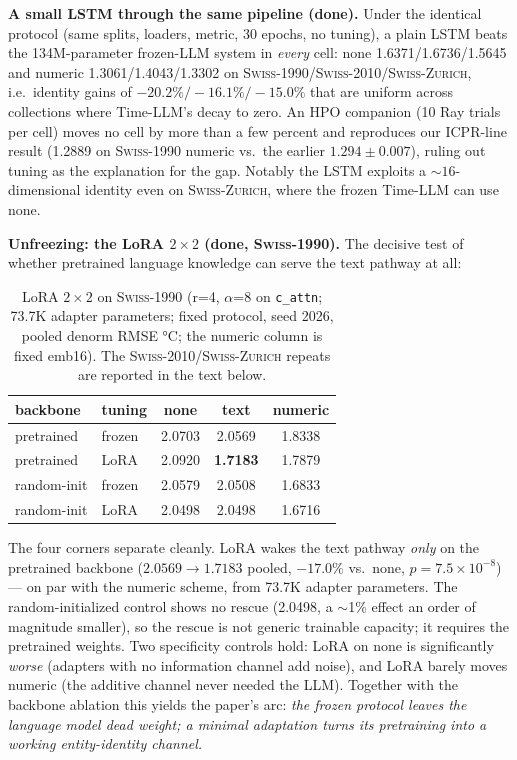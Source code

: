 \documentclass[sigconf,review]{acmart}
\newcommand{\inprogress}[1]{\textcolor{blue}{\textbf{[IN PROGRESS:} #1\textbf{]}}}
\newcommand{\swiss}{\textsc{Swiss-1990}}
\newcommand{\swissb}{\textsc{Swiss-2010}}
\newcommand{\swissc}{\textsc{Swiss-Zurich}}
\begin{document}
\textbf{A small LSTM through the same pipeline (done).} Under the identical
protocol (same splits, loaders, metric, 30 epochs, no tuning), a plain LSTM beats
the 134M-parameter frozen-LLM system in \emph{every} cell: \textsf{none}
1.6371/1.6736/1.5645 and \textsf{numeric} 1.3061/1.4043/1.3302 on
\swiss{}/\swissb{}/\swissc{}, i.e.\ identity gains of $-20.2\%/-16.1\%/-15.0\%$
that are uniform across collections where Time-LLM's decay to zero. An HPO
companion (10 Ray trials per cell) moves no cell by more than a few percent and
reproduces our ICPR-line result (1.2889 on \swiss{} numeric vs.\ the earlier
$1.294\pm0.007$), ruling out tuning as the explanation for the gap. Notably the
LSTM exploits a ${\sim}16$-dimensional identity even on \swissc{}, where the
frozen Time-LLM can use none.

\textbf{Unfreezing: the LoRA $2{\times}2$ (done, \swiss{}).} The decisive test
of whether pretrained language knowledge can serve the text pathway at all:

\begin{table}[t]
\caption{LoRA $2{\times}2$ on \swiss{} (r=4, $\alpha$=8 on \texttt{c\_attn};
73.7K adapter parameters; fixed protocol, seed 2026, pooled denorm RMSE °C;
the \textsf{numeric} column is fixed emb16).
The \swissb{}/\swissc{} repeats are reported in the text below.}
\label{tab:lora}
\begin{tabular}{@{}llccc@{}}
\toprule
backbone & tuning & \textsf{none} & \textsf{text} & \textsf{numeric} \\
\midrule
pretrained & frozen & 2.0703 & 2.0569 & 1.8338 \\
pretrained & LoRA & 2.0920 & \textbf{1.7183} & 1.7879 \\
random-init & frozen & 2.0579 & 2.0508 & 1.6833 \\
random-init & LoRA & 2.0498 & 2.0498 & 1.6716 \\
\bottomrule
\end{tabular}
\end{table}

The four corners separate cleanly. LoRA wakes the text pathway \emph{only} on the
pretrained backbone ($2.0569\rightarrow1.7183$ pooled, $-17.0\%$ vs.\ \textsf{none},
$p{=}7.5{\times}10^{-8}$) --- on par with the numeric scheme, from 73.7K adapter
parameters. The random-initialized control shows no rescue (2.0498, a $\sim$1\%
effect an order of magnitude smaller), so the rescue is not generic trainable
capacity; it requires the pretrained weights. Two specificity controls hold: LoRA
on \textsf{none} is significantly \emph{worse} (adapters with no information
channel add noise), and LoRA barely moves \textsf{numeric} (the additive channel
never needed the LLM). Together with the backbone ablation this yields the paper's
arc: \emph{the frozen protocol leaves the language model dead weight; a minimal
adaptation turns its pretraining into a working entity-identity channel.}
\end{document}
